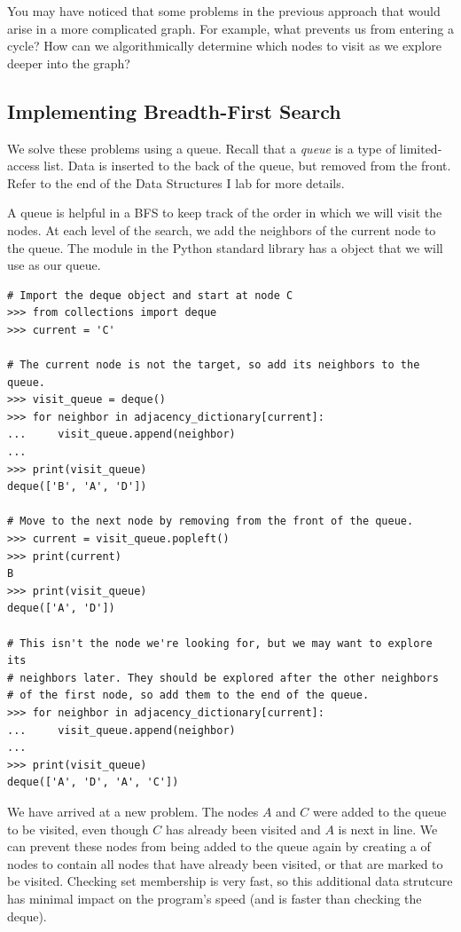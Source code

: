 You may have noticed that some problems in the previous approach that would arise in a more complicated graph.
For example, what prevents us from entering a cycle?
How can we algorithmically determine which nodes to visit as we explore deeper into the graph?

\subsection*{Implementing Breadth-First Search}

We solve these problems using a queue.
Recall that a \emph{queue} is a type of limited-access list.
Data is inserted to the back of the queue, but removed from the front.
Refer to the end of the Data Structures I lab for more details.

A queue is helpful in a BFS to keep track of the order in which we will visit the nodes.
At each level of the search, we add the neighbors of the current node to the queue.
The  module in the Python standard library has a  object that we will use as our queue.

\begin{lstlisting}
# Import the deque object and start at node C
>>> from collections import deque
>>> current = 'C'

# The current node is not the target, so add its neighbors to the queue.
>>> visit_queue = deque()
>>> for neighbor in adjacency_dictionary[current]:
...     visit_queue.append(neighbor)
...
>>> print(visit_queue)
deque(['B', 'A', 'D'])

# Move to the next node by removing from the front of the queue.
>>> current = visit_queue.popleft()
>>> print(current)
B
>>> print(visit_queue)
deque(['A', 'D'])

# This isn't the node we're looking for, but we may want to explore its
# neighbors later. They should be explored after the other neighbors
# of the first node, so add them to the end of the queue.
>>> for neighbor in adjacency_dictionary[current]:
...     visit_queue.append(neighbor)
...
>>> print(visit_queue)
deque(['A', 'D', 'A', 'C'])
\end{lstlisting}

We have arrived at a new problem.
The nodes $A$ and $C$ were added to the queue to be visited, even though $C$ has already been visited and $A$ is next in line.
We can prevent these nodes from being added to the queue again by creating a  of nodes to contain all nodes that have already been visited, or that are marked to be visited.
Checking set membership is very fast, so this additional data strutcure has minimal impact on the program's speed (and is faster than checking the deque).

